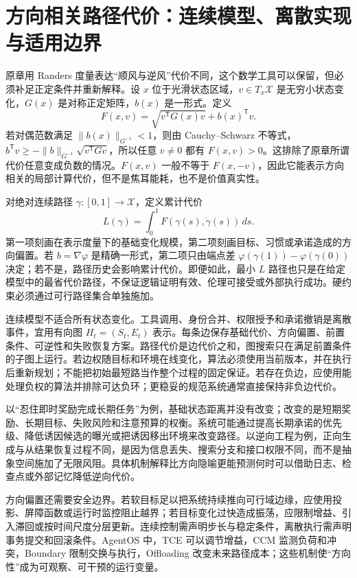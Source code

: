 \section{方向相关路径代价：连续模型、离散实现与适用边界}
\label{sec:section_5960}

原章用 Randers 度量表达“顺风与逆风”代价不同，这个数学工具可以保留，但必须补足正定条件并重新解释。设 $x$ 位于光滑状态区域，$v\in T_x\mathcal X$ 是无穷小状态变化，$G(x)$ 是对称正定矩阵，$b(x)$ 是一形式。定义
\begin{equation}
    F(x,v)=\sqrt{v^{\mathsf T}G(x)v}+b(x)^{\mathsf T}v.
\end{equation}
若对偶范数满足 $\lVert b(x)\rVert_{G^{-1}}<1$，则由 Cauchy--Schwarz 不等式，$b^{\mathsf T}v\geq-\lVert b\rVert_{G^{-1}}\sqrt{v^{\mathsf T}Gv}$，所以任意 $v\neq0$ 都有 $F(x,v)>0$。这排除了原章所谓代价任意变成负数的情况。$F(x,v)$ 一般不等于 $F(x,-v)$，因此它能表示方向相关的局部计算代价，但不是焦耳能耗，也不是价值真实性。

对绝对连续路径 $\gamma:[0,1]\to\mathcal X$，定义累计代价
\begin{equation}
    L(\gamma)=\int_0^1F(\gamma(s),\dot\gamma(s))\,ds.
\end{equation}
第一项刻画在表示度量下的基础变化规模，第二项刻画目标、习惯或承诺造成的方向偏置。若 $b=\nabla\varphi$ 是精确一形式，第二项只由端点差 $\varphi(\gamma(1))-\varphi(\gamma(0))$ 决定；若不是，路径历史会影响累计代价。即便如此，最小 $L$ 路径也只是在给定模型中的最省代价路径，不保证逻辑证明有效、伦理可接受或外部执行成功。硬约束必须通过可行路径集合单独施加。

连续模型不适合所有状态变化。工具调用、身份合并、权限授予和承诺撤销是离散事件，宜用有向图 $H_t=(S_t,E_t)$ 表示。每条边保存基础代价、方向偏置、前置条件、可逆性和失败恢复方案。路径代价是边代价之和，图搜索只在满足前置条件的子图上运行。若边权随目标和环境在线变化，算法必须使用当前版本，并在执行后重新规划；不能把初始最短路当作整个过程的固定保证。若存在负边，应使用能处理负权的算法并排除可达负环；更稳妥的规范系统通常直接保持非负边代价。

以“忍住即时奖励完成长期任务”为例，基础状态距离并没有改变；改变的是短期奖励、长期目标、失败风险和注意预算的权衡。系统可能通过提高长期承诺的优先级、降低诱因候选的曝光或把诱因移出环境来改变路径。以逆向工程为例，正向生成与从结果恢复过程不同，是因为信息丢失、搜索分支和接口权限不同，而不是抽象空间施加了无限风阻。具体机制解释比方向隐喻更能预测何时可以借助日志、检查点或外部记忆降低逆向代价。

方向偏置还需要安全边界。若软目标足以把系统持续推向可行域边缘，应使用投影、屏障函数或运行时监控阻止越界；若目标变化过快造成振荡，应限制增益、引入滞回或按时间尺度分层更新。连续控制需声明步长与稳定条件，离散执行需声明事务提交和回滚条件。AgentOS 中，TCE 可以调节增益，CCM 监测负荷和冲突，Boundary 限制交换与执行，Offloading 改变未来路径成本；这些机制使“方向性”成为可观察、可干预的运行变量。

